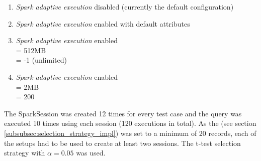 \begin{enumerate}
	\item \textit{Spark adaptive execution} disabled (currently the default configuration)
	\item \textit{Spark adaptive execution} enabled with default attributes
	\item \textit{Spark adaptive execution} enabled\\
	 = 512MB\\
	 = -1 (unlimited)
	\item \textit{Spark adaptive execution} enabled\\
	 = 2MB\\
	 = 200
\end{enumerate}

The SparkSession was created 12 times for every test case and the query was executed 10 times using each session (120 executions in total). As the  (see section \ref{subsubsec:selection_strategy_impl}) was set to a minimum of 20 records, each of the setups had to be used to create at least two sessions. The t-test selection strategy with $\alpha = 0.05$ was used.


